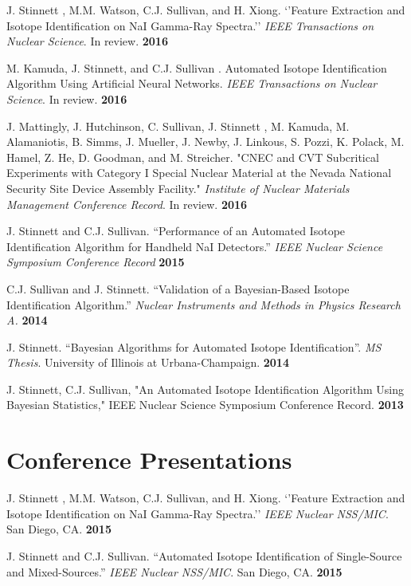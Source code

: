 \documentclass[margin]{res}
\begin{document}
\begin{resume}
J. Stinnett , M.M. Watson, C.J. Sullivan, and H. Xiong. `'Feature Extraction and Isotope Identification on NaI Gamma-Ray Spectra.'' \textit{IEEE Transactions on Nuclear Science}. In review. \hfill \textbf{2016}

M. Kamuda, J. Stinnett, and C.J. Sullivan . Automated Isotope Identification Algorithm Using Artificial Neural Networks. \textit{IEEE Transactions on Nuclear Science}. In review. \hfill \textbf{2016}

J. Mattingly, J. Hutchinson, C. Sullivan, J. Stinnett , M. Kamuda, M. Alamaniotis, B. Simms, J. Mueller, J. Newby, J. Linkous, S. Pozzi, K. Polack, M. Hamel, Z. He, D. Goodman, and M. Streicher.  "CNEC and CVT Subcritical Experiments with Category I Special Nuclear Material at the Nevada National Security Site Device Assembly Facility." \textit{Institute of Nuclear Materials Management Conference Record}. In review. \hfill \textbf{2016}

J. Stinnett and C.J. Sullivan.  ``Performance of an Automated Isotope Identification Algorithm for Handheld NaI Detectors.''  \textit{IEEE Nuclear Science Symposium Conference Record}   \hfill \textbf{2015}

C.J. Sullivan and J. Stinnett.  ``Validation of a Bayesian-Based Isotope Identification Algorithm.''  \textit{Nuclear Instruments and Methods in Physics Research A.}   \hfill \textbf{2014}

\vspace{-.05in}

J. Stinnett.  ``Bayesian Algorithms for Automated Isotope Identification''.  \textit{MS Thesis}.  University of Illinois at Urbana-Champaign. \hfill \textbf{2014}

\vspace{-.05in}

J. Stinnett, C.J. Sullivan, "An Automated Isotope Identification Algorithm Using Bayesian Statistics," IEEE Nuclear Science Symposium Conference Record. \hfill \textbf{2013}

\section{Conference Presentations}
J. Stinnett , M.M. Watson, C.J. Sullivan, and H. Xiong. `'Feature Extraction and Isotope Identification on NaI Gamma-Ray Spectra.'' \textit{IEEE Nuclear NSS/MIC}. San Diego, CA.  \hfill \textbf{2015}

J. Stinnett and C.J. Sullivan.  ``Automated Isotope Identification of Single-Source and Mixed-Sources.''  \textit{IEEE Nuclear NSS/MIC}. San Diego, CA.  \hfill \textbf{2015}


\end{resume}
\end{document}
